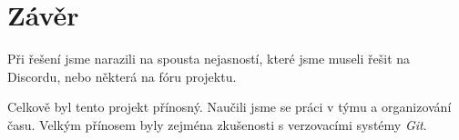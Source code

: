 \section{Závěr}
Při řešení jsme narazili na spousta nejasností, které jsme museli řešit na Discordu, nebo některá na fóru projektu.

Celkově byl tento projekt přínosný. Naučili jsme se práci v týmu a organizování času.
Velkým přínosem byly zejména zkušenosti s verzovacími systémy \textit{Git}.

\newpage